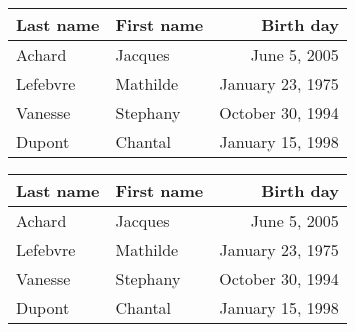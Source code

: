 \documentclass[dvipsnames]{article}%
\begin{document}
\begin{Code}
\begin{NiceTabular}{@{}llr@{}}
\toprule \RowStyle{\bfseries}
Last name & First name & Birth day \\
\midrule
Achard\emph{}
& Jacques & June 5, 2005 \\
Lefebvre\emph{} 
& Mathilde & January 23, 1975 \\
Vanesse & Stephany & October 30, 1994 \\
Dupont & Chantal & January 15, 1998 \\
\bottomrule
\end{NiceTabular}
\end{Code}


\begin{center}
\begin{NiceTabular}{@{}llr@{}}
\toprule \RowStyle{\bfseries}
Last name & First name & Birth day \\
\midrule
Achard 
& Jacques & June 5, 2005 \\
Lefebvre 
& Mathilde & January 23, 1975 \\
Vanesse & Stephany & October 30, 1994 \\
Dupont & Chantal & January 15, 1998 \\
\bottomrule
\end{NiceTabular}
\end{center}
\end{document}
